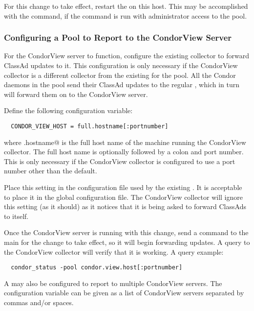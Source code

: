 For this change to take effect, restart the
 on this host.
This may be accomplished with the  command,
if the command is run with
administrator access to the pool.


\subsubsection{\label{sec:CondorView-Pool-Setup}
Configuring a Pool to Report to the CondorView Server} 

For the CondorView server to function, configure the existing collector to
forward ClassAd updates to it.
This configuration is only necessary if 
the CondorView collector is a different collector from the existing
 for the pool.
All the Condor daemons in the pool send their ClassAd updates to the
regular , which in turn will forward them on to the
CondorView server.

Define the following configuration variable:
\footnotesize
\begin{verbatim}
  CONDOR_VIEW_HOST = full.hostname[:portnumber]
\end{verbatim}
\normalsize
where \verb@full.hostname@ is the full host name of the machine 
running the CondorView collector.
The full host name is optionally followed by a colon and
port number.  This is only necessary if the CondorView
collector is configured to use a port number other than the default.

Place this setting in the configuration file used by the existing 
.
It is acceptable to place it in the global configuration file.  The
CondorView collector will ignore this setting (as it should) as it notices
that it is being asked to forward ClassAds to itself.

Once the CondorView server is running with this 
change, send a
 command to the main  for the change to
take effect, so it will begin forwarding updates.  
A query to the CondorView collector will verify that it is working.
A query example:

\footnotesize
\begin{verbatim}
  condor_status -pool condor.view.host[:portnumber]
\end{verbatim}
\normalsize


A  may also be configured to report to multiple CondorView
servers.  The configuration variable  can be
given as a list of CondorView servers separated by commas and/or spaces.

